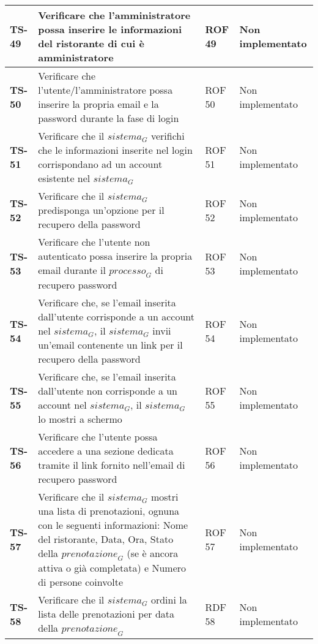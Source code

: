 \begin{longtable}{|>{\centering\arraybackslash}p{1.5cm}|p{9.8cm}|p{2cm}|p{3.5cm}|}
    \hline
    \rowcolor{gray!10}
    \textbf{TS-49} & Verificare che l'amministratore possa inserire le informazioni del ristorante di cui è amministratore & ROF 49 & Non implementato \\
    \hline
    \rowcolor{gray!10}
    \textbf{TS-50} & Verificare che l'utente/l'amministratore possa inserire la propria email e la password durante la fase di login & ROF 50 & Non implementato \\ 
    \hline
    \rowcolor{gray!10}
    \textbf{TS-51} & Verificare che il $\textit{sistema}_G$ verifichi che le informazioni inserite nel login corrispondano ad un account esistente nel $\textit{sistema}_G$ & ROF 51 & Non implementato \\ 
    \hline
    \rowcolor{gray!10}
    \textbf{TS-52} & Verificare che il $\textit{sistema}_G$ predisponga un'opzione per il recupero della password & ROF 52 & Non implementato \\ 
    \hline
    \rowcolor{gray!10}
    \textbf{TS-53} & Verificare che l'utente non autenticato possa inserire la propria email durante il $\textit{processo}_G$ di recupero password & ROF 53 & Non implementato \\ 
    \hline
    \rowcolor{gray!10}
    \textbf{TS-54} & Verificare che, se l'email inserita dall'utente corrisponde a un account nel $\textit{sistema}_G$, il $\textit{sistema}_G$ invii un'email contenente un link per il recupero della password & ROF 54 & Non implementato \\
    \hline
    \rowcolor{gray!10}
    \textbf{TS-55} & Verificare che, se l'email inserita dall'utente non corrisponde a un account nel $\textit{sistema}_G$, il $\textit{sistema}_G$ lo mostri a schermo & ROF 55 & Non implementato \\ 
    \hline
    \rowcolor{gray!10}
    \textbf{TS-56} & Verificare che l'utente possa accedere a una sezione dedicata tramite il link fornito nell'email di recupero password & ROF 56 & Non implementato \\ 
    \hline
    \rowcolor{gray!10}
    \textbf{TS-57} & Verificare che il $\textit{sistema}_G$ mostri una lista di prenotazioni, ognuna con le seguenti informazioni:
    Nome del ristorante, Data, Ora, Stato della $\textit{prenotazione}_G$ (se è ancora attiva o già completata) e Numero di persone coinvolte & ROF 57 & Non implementato \\
    \hline
    \rowcolor{gray!10}
    \textbf{TS-58} & Verificare che il $\textit{sistema}_G$ ordini la lista delle prenotazioni per data della $\textit{prenotazione}_G$ & RDF 58 & Non implementato \\ 

\end{longtable}
